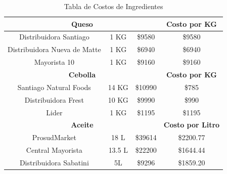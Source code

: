 \documentclass[12pt]{article}
\begin{document}
\begin{table}[h!]
\begin{tabular}{|| c | c | c | c||}
        \multicolumn{3}{||c|}{\textbf{Queso}} & \textbf{Costo por KG} \\ [0.5ex] \hline \hline %
        Distribuidora Santiago & 1 KG & \$9580 & \$9580 \\ \hline
        Distribuidora Nueva de Matte & 1 KG & \$6940 & \$6940 \\ \hline
        Mayorista 10 & 1 KG & \$9160 & \$9160 \\ [1ex] \hline \hline

        \multicolumn{3}{||c|}{\textbf{Cebolla}} & \textbf{Costo por KG} \\ [0.5ex] \hline \hline %
        Santiago Natural Foods & 14 KG & \$10990 & \$785 \\ \hline
        Distribuidora Frest & 10 KG & \$9990 & \$990 \\ \hline
        Lider & 1 KG & \$1195 & \$1195 \\ [1ex] \hline \hline

        \multicolumn{3}{||c|}{\textbf{Aceite}} & \textbf{Costo por Litro} \\ [0.5ex] \hline \hline
        ProsudMarket & 18 L & \$39614 & \$2200.77 \\ \hline
        Central Mayorista & 13.5 L & \$22200 & \$1644.44 \\ \hline
        Distribuidora Sabatini & 5L & \$9296 & \$1859.20 \\ [1ex] \hline \hline

    \end{tabular}
    \caption{Tabla de Costos de Ingredientes}
    \label{tab:costos_ingredientes}
\end{table}
\end{document}
